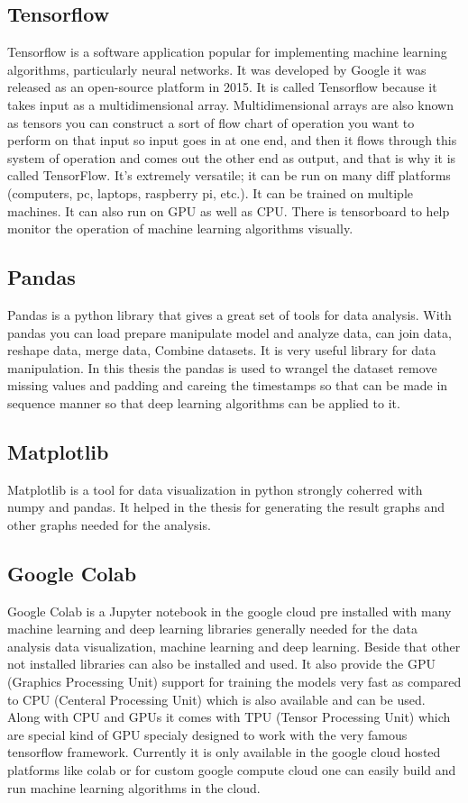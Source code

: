 \subsection{Tensorflow}
Tensorflow is a software application popular for implementing machine learning algorithms, particularly neural networks. It was developed by Google it was released as an open-source platform in 2015. It is called Tensorflow because it takes input as a multidimensional array. Multidimensional arrays are also known as tensors you can construct a sort of flow chart of operation you want to perform on that input so input goes in at one end, and then it flows through this system of operation and comes out the other end as output, and that is why it is called TensorFlow. It's extremely versatile; it can be run on many diff platforms (computers, pc, laptops, raspberry pi, etc.). It can be trained on multiple machines. It can also run on GPU as well as CPU. There is tensorboard to help monitor the operation of machine learning algorithms visually.  

\subsection{Pandas}
Pandas is a python library that gives a great set of tools for data analysis. With pandas you can load prepare manipulate model and analyze data, can join data, reshape data, merge data, Combine datasets. It is very useful library for data manipulation. In this thesis the pandas is used to wrangel the dataset remove missing values and padding and careing the timestamps so that can be made in sequence manner so that deep learning algorithms can be applied to it.
\\

\subsection{Matplotlib}
Matplotlib is a tool for data visualization in python strongly coherred with numpy and pandas. It helped in the thesis for generating the result graphs and other graphs needed for the analysis.
\\

\subsection{Google Colab}
Google Colab is a Jupyter notebook in the google cloud pre installed with many machine learning and deep learning libraries generally needed for the data analysis data visualization, machine learning and deep learning. Beside that other not installed libraries can also be installed and used. It also provide the GPU (Graphics Processing Unit) support for training the models very fast as compared to CPU (Centeral Processing Unit) which is also available and can be used. Along with CPU and GPUs it comes with TPU (Tensor Processing Unit) which are special kind of GPU specialy designed to work with the very famous tensorflow framework. Currently it is only available in the google cloud hosted platforms like colab or for custom google compute cloud one can easily build and run machine learning algorithms in the cloud.
\\

